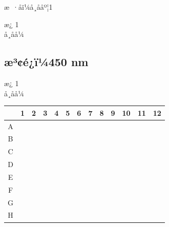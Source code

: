 \documentclass[UTF8,10pt,a4paper,fontset=fandol]{ctexart}
\begin{document}
\noindent
æ ·åï¼å¸ååº¦1

\noindent
æ¿ 1\\
å¸åå¼

\subsection*{æ³¢é¿ï¼450 nm}

\noindent
æ¿ 1\\
å¸åå¼

\begin{center}
\scriptsize
\begin{tabular}{c|*{12}{p{0.52cm}|}}
 & 1 & 2 & 3 & 4 & 5 & 6 & 7 & 8 & 9 & 10 & 11 & 12\\ \hline
A & & & &
\parbox[t]{0.5cm}{} &
\parbox[t]{0.5cm}{} &
\parbox[t]{0.5cm}{} &
\parbox[t]{0.5cm}{} &
\parbox[t]{0.5cm}{} &
\parbox[t]{0.5cm}{} &
& & \\ \hline
B & & & &
\parbox[t]{0.5cm}{} &
\parbox[t]{0.5cm}{} &
\parbox[t]{0.5cm}{} &
\parbox[t]{0.5cm}{} &
\parbox[t]{0.5cm}{} &
\parbox[t]{0.5cm}{} &
& & \\ \hline
C & & & &
\parbox[t]{0.5cm}{} &
\parbox[t]{0.5cm}{} &
\parbox[t]{0.5cm}{} &
\parbox[t]{0.5cm}{} &
\parbox[t]{0.5cm}{} &
\parbox[t]{0.5cm}{} &
& & \\ \hline
D & & & &
\parbox[t]{0.5cm}{} &
\parbox[t]{0.5cm}{} &
\parbox[t]{0.5cm}{} &
\parbox[t]{0.5cm}{} &
\parbox[t]{0.5cm}{} &
\parbox[t]{0.5cm}{} &
& & \\ \hline
E & & & &
\parbox[t]{0.5cm}{} &
\parbox[t]{0.5cm}{} &
\parbox[t]{0.5cm}{} &
\parbox[t]{0.5cm}{} &
\parbox[t]{0.5cm}{} &
\parbox[t]{0.5cm}{} &
& & \\ \hline
F & & & &
\parbox[t]{0.5cm}{} &
\parbox[t]{0.5cm}{} &
\parbox[t]{0.5cm}{} &
\parbox[t]{0.5cm}{} &
\parbox[t]{0.5cm}{} &
\parbox[t]{0.5cm}{} &
& & \\ \hline
G & & & &
\parbox[t]{0.5cm}{} &
\parbox[t]{0.5cm}{} &
\parbox[t]{0.5cm}{} &
\parbox[t]{0.5cm}{} &
\parbox[t]{0.5cm}{} &
\parbox[t]{0.5cm}{} &
& & \\ \hline
H & & & &
\parbox[t]{0.5cm}{} &
\parbox[t]{0.5cm}{} &
\parbox[t]{0.5cm}{} &
\parbox[t]{0.5cm}{} &
\parbox[t]{0.5cm}{} &
\parbox[t]{0.5cm}{} &
& & \\ \hline
\end{tabular}
\end{center}
\end{document}
